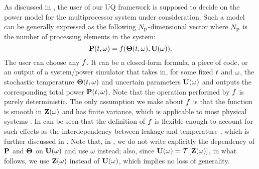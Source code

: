 As discussed in , the user of our UQ framework is supposed to decide on the power model for the multiprocessor system under consideration. Such a model can be generally expressed as the following ${N_\text{p}}$-dimensional vector where ${N_\text{p}}$ is the number of processing elements in the system:
\begin{equation} \elabel{power-model}
  \vP(\t, \o) = \f(\vTO(\t, \o), \vU(\o)).
\end{equation}
The user can choose any $f$. It can be a closed-form formula, a piece of code, or an output of a system/power simulator that takes in, for some fixed $t$ and $\omega$, the stochastic temperature ${\boldsymbol\Theta}(t, \omega)$ and uncertain parameters $\mathbf{U}(\omega)$ and outputs the corresponding total power $\mathbf{P}(t, \omega)$. Note that the operation performed by $f$ is purely deterministic. The only assumption we make about $f$ is that the function is smooth in $\mathbf{Z}(\omega)$ and has finite variance, which is applicable to most physical systems \cite{xiu2010}. In can be seen that the definition of $f$ is flexible enough to account for such effects as the interdependency between leakage and temperature \cite{srivastava2010, liu2007}, which is further discussed in . Note that, in , we do not write explicitly the dependency of $\mathbf{P}$ and ${\boldsymbol\Theta}$ on $\mathbf{U}(\omega)$ and use $\omega$ instead; also, since $\vU(\o) = \oTransform{\vZ(\o)}$, in what follows, we use $\mathbf{Z}(\omega)$ instead of $\mathbf{U}(\omega)$, which implies no loss of generality.
